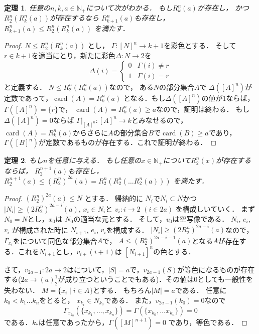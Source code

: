\documentclass[leqno, 12pt]{jsarticle}
\newtheorem{thm}{定理}
\newcommand{\nn}{\mathbb{N}}
\DeclareMathOperator{\card}{card}
\begin{document}
\begin{thm}
任意の$n, k, a\in \nn_{+}$について次がわかる．
もし$R_k^n(a)$が存在し，
かつ$R_2^n(R_k^n(a))$が存在するなら
$R_{k+1}^n(a)$も存在し，
$R_{k+1}^n(a)\le R_{2}^n(R_k^n(a))$
を満たす．
\end{thm}
\begin{proof}
$N\le R_{2}^n(R_k^n(a))$
とし，
$\Gamma: [N]^n\to k+1$を彩色とする．
そして$r\in k+1$を適当にとり，新たに彩色$\Delta:N\to 2 $を
\[
\Delta(i)=
\begin{cases}
0 & \text{$\Gamma(i)\neq r$}\\
1 & \text{$\Gamma(i)=r$}
\end{cases}
\]
と定義する．
$N\le R_{2}^n(R_k^n(a))$なので，
ある$N$の部分集合$A$で $\Delta([A]^n)$が定数であって，$\card(A)=R_k^n(a)$
となる．もし$\Delta([A]^n)$の値が$1$ならば，$\Gamma([A]^n)=\{r\}$で，
$\card(A)=R_k^n(a)\ge a$なので，証明は終わる．
もし$\Delta([A]^n)=0$ならば
$\Gamma|_{[A]^n}: [A]^n\to k$とみなせるので，
$\card(A)=R_k^n(a)$からさらに$A$の部分集合$B$で$\card(B)\ge a $であり，$\Gamma([B]^n)$が定数であるものが存在する．これで証明が終わる．
\end{proof}

\begin{thm}
もし$n$を任意に与える．
もし任意の$x\in \nn_{+}$について$R_2^n(x)$が存在するならば，
$R_2^{n+1}(a)$も存在し，
$R_2^{n+1}(a)\le (R_2^n)^{2a}(a)=R_2^n(R_2^n(\dots R_2^n(a)))$
を満たす．
\end{thm}
\begin{proof}
$(R_2^n)^{2a}(a)\le N$
とする．
帰納的に 
$N_i$で$N_i\subset N$かつ$|N_i|\ge (2R_2^n)^{2a-i}(a)$, 
$x_i\in N_i$と
$v_i:i\to 2$
 $(i\in 2a)$
を構成しいていく．
まず$N_0=N$とし，$x_0$は $N_0$の適当な元とする．
そして，$v_0$は空写像である．
$N_i$, $e_i$, $v_i$
が構成された時に $N_{i+1}$, $e_i$, $v_i$を構成する．
$|N_i|\ge  (2R_2^n)^{2a-i}(a)$なので，
$\Gamma_{x_i}$をについて同色な部分集合$A$で，
$A\le (R_2^n)^{2a-i-1}(a)$となる$A$が存在する．これを$N_{i+1}$とし，$v_{i+}(i+1)$は
$[N_{i+1}]^{n}$の色とする．

さて，$v_{2a-1}:2a\to 2$はについて，$|S|=a$で，$v_{2a-1}(S)$が等色になるものが存在する($2a\to (a)_2^1$が成り立つということでもある)．その値は$0$としても一般性を失わない．
$M=\{x_i\mid i\in A\}$とする．
もちろん$|M|=a$である．
任意に$k_0<k_1\dots k_n$をとると，
$x_{k_i}\in N_{k_0}$である．
また，$v_{2a-1}(k_0)=0$なので
\[
\Gamma_{x_{k_0}}(\{x_{k_1}, \dots, x_{k_n}\})=\Gamma(\{x_{k_0},\dots x_{k_n}\})=0
\]
である．$k_*$は任意であったから，$\Gamma([M]^{n+1})=0$
であり，等色である．
\end{proof}
\end{document}
